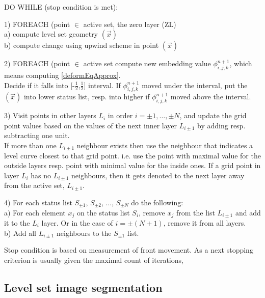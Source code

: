 \par
DO WHILE (stop condition is met):
\par
1) FOREACH (point $\in$ active set, the zero layer (ZL)\\
  a) compute level set geometry $(\vec x)$\\
  b) compute change using upwind scheme in point $(\vec x)$
\par
2) FOREACH (point $\in$ active set compute new embedding value $\phi_{i,j,k}^{n+1}$, which means computing \ref{deformEqApprox}.\\
Decide if it falls into [-$\frac{1}{2}$,$\frac{1}{2}$] interval.
If $\phi_{i,j,k}^{n+1}$ moved under the interval, put the $(\vec x)$ into lower status list, resp. into higher if $\phi_{i,j,k}^{n+1}$ moved above the interval.
\par
3) Visit points in other layers $L_i$ in order $i=\pm 1,\ldots, \pm N$, and update the grid point values based on the values of the next inner layer $L_{i\pm1}$ by adding resp. subtracting one unit.\\
If more than one $L_{i\pm1}$ neighbour exists then use the neighbour that indicates a level curve closest to that grid point. i.e. use the point with maximal value for the outside layers resp. point with minimal value for the inside ones.
If a grid point in layer $L_i$ has no $L_{i\pm1}$ neighbours, then it gets denoted to the next layer away from the active set, $L_{i\pm1}$.
\par
4) For each status list $S_{\pm1}$, $S_{\pm2}$, $\ldots$, $S_{\pm N}$ do the following:\\
  a) For each element $x_j$ on the status list $S_i$, remove $x_j$ from the list $L_{i\pm1}$ and add it to the $L_{i}$ layer.
Or in the case of $i=\pm (N + 1)$, remove it from all layers.\\
  b) Add all $L_{i\pm1}$ neighbours to the $S_{\pm1}$ list.

\par
Stop condition is based on measurement of front movement.
As a next stopping criterion is usually given the maximal count of iterations,

\subsection{Level set image segmentation}

